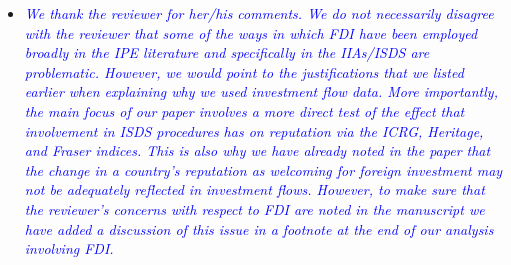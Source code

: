 \begin{enumerate}
	\begin{itemize}
		\item \textcolor{blue}{ \emph{
		We thank the reviewer for her/his comments. We do not necessarily disagree with the reviewer that some of the ways in which FDI have been employed broadly in the IPE literature and specifically in the IIAs/ISDS are problematic. However, we would point to the justifications that we listed earlier when explaining why we used investment flow data. More importantly, the main focus of our paper involves a more direct test of the effect that involvement in ISDS procedures has on reputation via the ICRG, Heritage, and Fraser indices. This is also why we have already noted in the paper that the change in a country's reputation as welcoming for foreign investment may not be adequately reflected in investment flows. However, to make sure that the reviewer's concerns with respect to FDI are noted in the manuscript we have added a discussion of this issue in a footnote at the end of our analysis involving FDI. 
		}}
	\end{itemize}
\end{enumerate}

